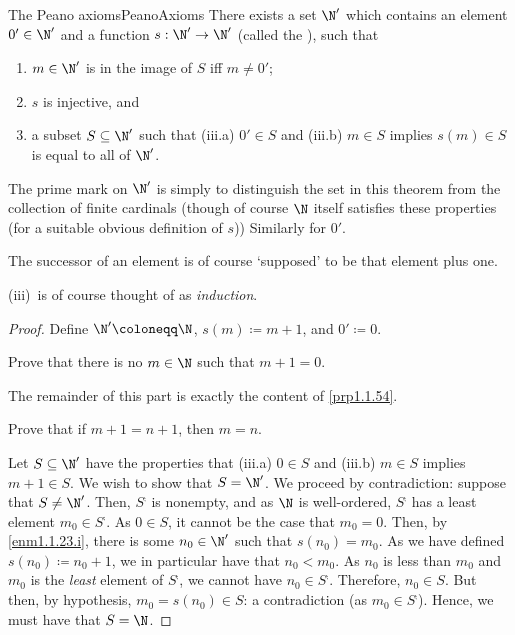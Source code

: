 \begin{thm}{The Peano axioms}{PeanoAxioms}
There exists a set $\N '$ which contains an element $0'\in \N'$ and a function $s:\N '\rightarrow \N '$ (called the ), such that
\begin{enumerate}
\item \label{enm1.1.23.i}$m\in \N '$ is in the image of $S$ iff $m\neq 0'$;
\item \label{enm1.1.23.ii}$s$ is injective, and
\item \label{enm1.1.23.iii} a subset $S\subseteq \N '$ such that (iii.a) $0'\in S$ and (iii.b) $m\in S$ implies $s(m)\in S$ is equal to all of $\N '$.
\end{enumerate}
\begin{rmk}
The prime mark on $\N '$ is simply to distinguish the set in this theorem from the collection of finite cardinals (though of course $\N$ itself satisfies these properties (for a suitable obvious definition of $s$))  Similarly for $0'$.
\end{rmk}
\begin{rmk}
The successor of an element is of course `supposed' to be that element plus one.
\end{rmk}
\begin{rmk}
(iii)~is of course thought of as \emph{induction}.
\end{rmk}
\begin{proof}
Define $\N '\coloneqq \N$, $s(m)\coloneqq m+1$, and $0'\coloneqq 0$.

\begin{exr}[breakable=false]{}{}
Prove that there is no $m\in \N$ such that $m+1=0$.
\end{exr}
The remainder of this part is exactly the content of \cref{prp1.1.54}.

\begin{exr}[breakable=false]{}{}
Prove that if $m+1=n+1$, then $m=n$.
\end{exr}

Let $S\subseteq \N '$ have the properties that (iii.a) $0\in S$ and (iii.b) $m\in S$ implies $m+1\in S$.  We wish to show that $S=\N '$.  We proceed by contradiction:  suppose that $S\neq \N '$.  Then, $S^{\comp}$ is nonempty, and as $\N$ is well-ordered, $S^{\comp}$ has a least element $m_0\in S^{\comp}$.  As $0\in S$, it cannot be the case that $m_0=0$.  Then, by \cref{enm1.1.23.i}, there is some $n_0\in \N '$ such that $s(n_0)=m_0$.  As we have defined $s(n_0)\coloneqq n_0+1$, we in particular have that $n_0<m_0$.  As $n_0$ is less than $m_0$ and $m_0$ is the \emph{least} element of $S^{\comp}$, we cannot have $n_0\in S^{\comp}$.  Therefore, $n_0\in S$.  But then, by hypothesis, $m_0=s(n_0)\in S$:  a contradiction (as $m_0\in S^{\comp}$).  Hence, we must have that $S=\N$.
\end{proof}
\end{thm}

